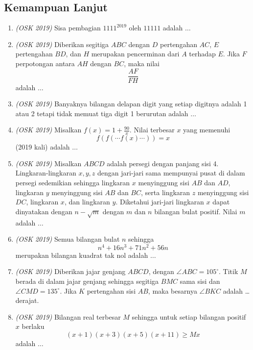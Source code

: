 \subsection{Kemampuan Lanjut}
\begin{enumerate}
	\item \textit{(OSK 2019)} Sisa pembagian $1111^{2019}$ oleh $11111$ adalah $\dots$
	
	\item \textit{(OSK 2019)} Diberikan segitiga $ABC$ dengan $D$ pertengahan $AC$, $E$ pertengahan $BD$, dan $H$ merupakan pencerminan dari $A$ terhadap $E$.  
	Jika $F$ perpotongan antara $AH$ dengan $BC$, maka nilai
	\[
	\frac{AF}{FH}
	\]
	adalah $\dots$
	
	\item \textit{(OSK 2019)} Banyaknya bilangan delapan digit yang setiap digitnya adalah 1 atau 2 tetapi tidak memuat tiga digit 1 berurutan adalah $\dots$
	
	\item \textit{(OSK 2019)} Misalkan $f(x) = 1 + \frac{90}{x}$.  
	Nilai terbesar $x$ yang memenuhi
	\[
	f(f(\cdots f(x)\cdots)) = x
	\]
	(2019 kali) adalah $\dots$
	
	\item \textit{(OSK 2019)} Misalkan $ABCD$ adalah persegi dengan panjang sisi 4.  
	Lingkaran-lingkaran $x, y, z$ dengan jari-jari sama mempunyai pusat di dalam persegi sedemikian sehingga lingkaran $x$ menyinggung sisi $AB$ dan $AD$, lingkaran $y$ menyinggung sisi $AB$ dan $BC$, serta lingkaran $z$ menyinggung sisi $DC$, lingkaran $x$, dan lingkaran $y$.  
	Diketahui jari-jari lingkaran $x$ dapat dinyatakan dengan $n - \sqrt{m}$ dengan $m$ dan $n$ bilangan bulat positif.  
	Nilai $m$ adalah $\dots$
	
	\item \textit{(OSK 2019)} Semua bilangan bulat $n$ sehingga
	\[
	n^4 + 16n^3 + 71n^2 + 56n
	\]
	merupakan bilangan kuadrat tak nol adalah $\dots$
	
	\item \textit{(OSK 2019)} Diberikan jajar genjang $ABCD$, dengan $\angle ABC = 105^\circ$.  
	Titik $M$ berada di dalam jajar genjang sehingga segitiga $BMC$ sama sisi dan $\angle CMD = 135^\circ$.  
	Jika $K$ pertengahan sisi $AB$, maka besarnya $\angle BKC$ adalah \dots derajat.
	
	\item \textit{(OSK 2019)} Bilangan real terbesar $M$ sehingga untuk setiap bilangan positif $x$ berlaku
	\[
	(x+1)(x+3)(x+5)(x+11) \ge Mx
	\]
	adalah $\dots$
	

\end{enumerate}
